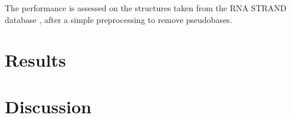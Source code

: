 \documentclass{article}
\begin{document}
The performance is assessed on the structures taken from the RNA STRAND database \cite{andronescu2008rna}, after a simple preprocessing to remove pseudobases.

\section{Results \label{results}}

\section{Discussion \label{discussion}}




\end{document}
